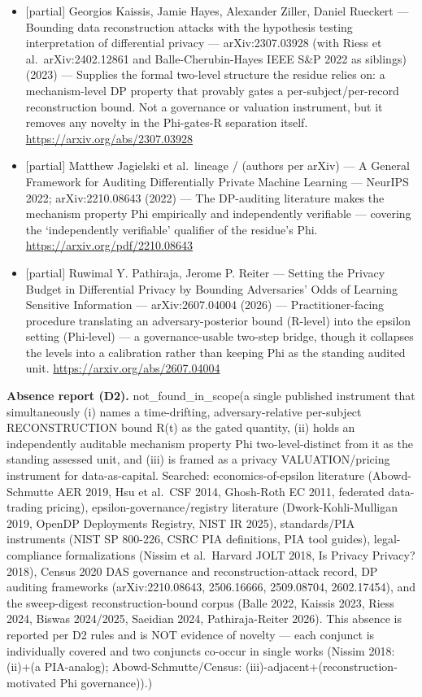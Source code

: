 \documentclass[
  11pt,
]{article}
\begin{document}
\begin{itemize}
  an audited standing unit. \url{https://arxiv.org/abs/1402.3329}
\item
  {[}partial{]} Georgios Kaissis, Jamie Hayes, Alexander Ziller, Daniel
  Rueckert --- Bounding data reconstruction attacks with the hypothesis
  testing interpretation of differential privacy --- arXiv:2307.03928
  (with Riess et al.~arXiv:2402.12861 and Balle-Cherubin-Hayes IEEE S\&P
  2022 as siblings) (2023) --- Supplies the formal two-level structure
  the residue relies on: a mechanism-level DP property that provably
  gates a per-subject/per-record reconstruction bound. Not a governance
  or valuation instrument, but it removes any novelty in the Phi-gates-R
  separation itself. \url{https://arxiv.org/abs/2307.03928}
\item
  {[}partial{]} Matthew Jagielski et al.~lineage / (authors per arXiv)
  --- A General Framework for Auditing Differentially Private Machine
  Learning --- NeurIPS 2022; arXiv:2210.08643 (2022) --- The DP-auditing
  literature makes the mechanism property Phi empirically and
  independently verifiable --- covering the `independently verifiable'
  qualifier of the residue's Phi. \url{https://arxiv.org/pdf/2210.08643}
\item
  {[}partial{]} Ruwimal Y. Pathiraja, Jerome P. Reiter --- Setting the
  Privacy Budget in Differential Privacy by Bounding Adversaries' Odds
  of Learning Sensitive Information --- arXiv:2607.04004 (2026) ---
  Practitioner-facing procedure translating an adversary-posterior bound
  (R-level) into the epsilon setting (Phi-level) --- a governance-usable
  two-step bridge, though it collapses the levels into a calibration
  rather than keeping Phi as the standing audited unit.
  \url{https://arxiv.org/abs/2607.04004}
\end{itemize}

\textbf{Absence report (D2).} not\_found\_in\_scope(a single published
instrument that simultaneously (i) names a time-drifting,
adversary-relative per-subject RECONSTRUCTION bound R(t) as the gated
quantity, (ii) holds an independently auditable mechanism property Phi
two-level-distinct from it as the standing assessed unit, and (iii) is
framed as a privacy VALUATION/pricing instrument for data-as-capital.
Searched: economics-of-epsilon literature (Abowd-Schmutte AER 2019, Hsu
et al.~CSF 2014, Ghosh-Roth EC 2011, federated data-trading pricing),
epsilon-governance/registry literature (Dwork-Kohli-Mulligan 2019,
OpenDP Deployments Registry, NIST IR 2025), standards/PIA instruments
(NIST SP 800-226, CSRC PIA definitions, PIA tool guides),
legal-compliance formalizations (Nissim et al.~Harvard JOLT 2018, Is
Privacy Privacy? 2018), Census 2020 DAS governance and
reconstruction-attack record, DP auditing frameworks (arXiv:2210.08643,
2506.16666, 2509.08704, 2602.17454), and the sweep-digest
reconstruction-bound corpus (Balle 2022, Kaissis 2023, Riess 2024,
Biswas 2024/2025, Saeidian 2024, Pathiraja-Reiter 2026). This absence is
reported per D2 rules and is NOT evidence of novelty --- each conjunct
is individually covered and two conjuncts co-occur in single works
(Nissim 2018: (ii)+(a PIA-analog); Abowd-Schmutte/Census:
(iii)-adjacent+(reconstruction-motivated Phi governance)).)
\end{document}
